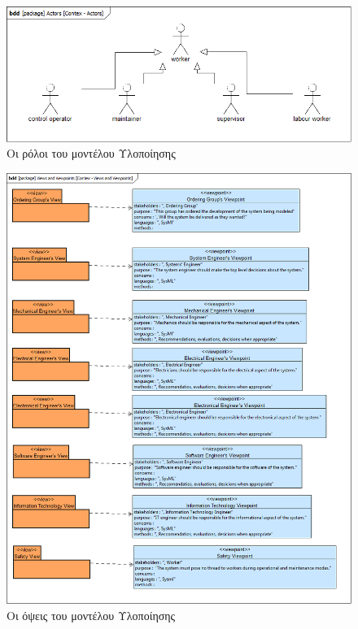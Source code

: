 \documentclass[a4paper,12pt,twoside]{report}
\begin{document}
{\begin{appendices}
				\begin{figure}[hp]
					\centering
					\includegraphics[scale=0.50]{DesignModel_Contex-Actors.png}
					\caption{Οι ρόλοι του μοντέλου Υλοποίησης}
					\label{φωτ:Οι ρόλοι του μοντέλου Υλοποίησης}
				\end{figure}
				
				\begin{figure}[hp]
					\centering
					\includegraphics[scale=0.30]{DesignModel_Contex-ViewsandViewpoints.png}
					\caption{Οι όψεις του μοντέλου Υλοποίησης}
					\label{φωτ:Οι όψεις του μοντέλου Υλοποίησης}
				\end{figure}
				

\end{appendices}}
\end{document}
